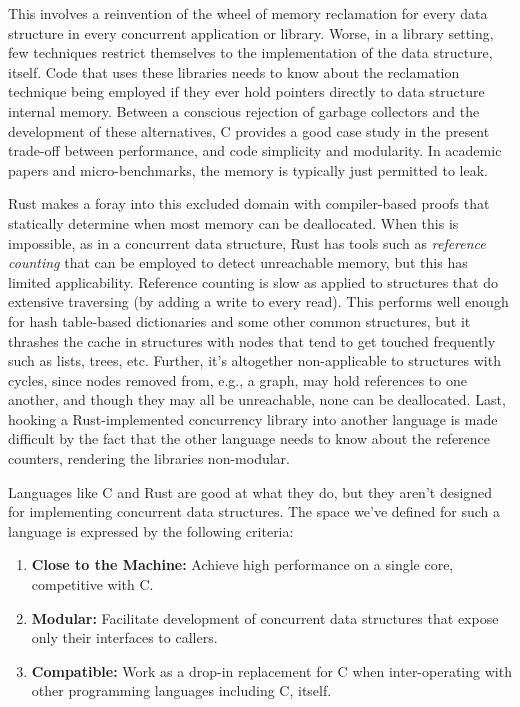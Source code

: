 This involves a reinvention of the wheel of memory reclamation for every data structure in every concurrent application or library.  Worse, in a library setting, few techniques restrict themselves to the implementation of the data structure, itself.  Code that uses these libraries needs to know about the reclamation technique being employed if they ever hold pointers directly to data structure internal memory.  Between a conscious rejection of garbage collectors and the development of these alternatives, C provides a good case study in the present trade-off between performance, and code simplicity and modularity.  In academic papers and micro-benchmarks, the memory is typically just permitted to leak.

Rust makes a foray into this excluded domain with compiler-based proofs that statically determine when most memory can be deallocated.\cite{Rust}  When this is impossible, as in a concurrent data structure, Rust has tools such as \textit{reference counting} that can be employed to detect unreachable memory, but this has limited applicability.  Reference counting is slow as applied to structures that do extensive traversing (by adding a write to every read).  This performs well enough for hash table-based dictionaries and some other common structures, but it thrashes the cache in structures with nodes that tend to get touched frequently such as lists, trees, etc.  Further, it's altogether non-applicable to structures with cycles, since nodes removed from, e.g., a graph, may hold references to one another, and though they may all be unreachable, none can be deallocated.  Last, hooking a Rust-implemented concurrency library into another language is made difficult by the fact that the other language needs to know about the reference counters, rendering the libraries non-modular.

Languages like C and Rust are good at what they do, but they aren't designed for implementing concurrent data structures.  The space we've defined for such a language is expressed by the following criteria:

\begin{enumerate}
        \item \textbf{Close to the Machine:} Achieve high performance on a single core, competitive with C.
        \item \textbf{Modular:} Facilitate development of concurrent data structures that expose only their interfaces to callers.
        \item \textbf{Compatible:} Work as a drop-in replacement for C when inter-operating with other programming languages including C, itself.
\end{enumerate}

